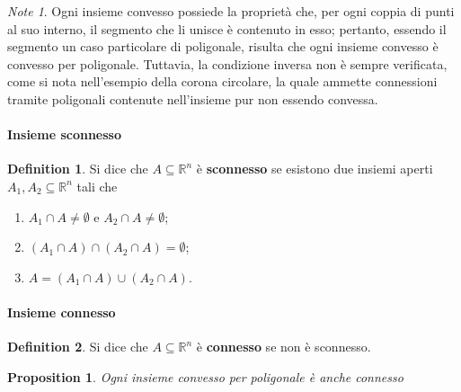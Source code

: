 \documentclass{article}
\theoremstyle{plain}
\newtheorem{prop}[thm]{Proposition}
\theoremstyle{definition}
\newtheorem{defn}{Definition}[section]
\theoremstyle{remark}
\newtheorem{note}{Note}
\begin{document}
\vspace{10pt}

\begin{note}
    Ogni insieme convesso possiede la proprietà che, per ogni coppia di punti al suo interno, il segmento che li unisce è contenuto in esso; pertanto, 
    essendo il segmento un caso particolare di poligonale, risulta che ogni insieme convesso è convesso per poligonale. 
    Tuttavia, la condizione inversa non è sempre verificata, come si nota nell'esempio della corona circolare, la quale ammette connessioni tramite 
    poligonali contenute nell'insieme pur non essendo convessa.
\end{note}

\vspace{10pt}

\paragraph{Insieme sconnesso}
\begin{bxthm}
\begin{defn}
    Si dice che $A\subseteq\mathbb{R}^n$ è \textbf{sconnesso} se esistono due insiemi aperti $A_1,A_2\subseteq\mathbb{R}^n$ tali che 
    \begin{enumerate}
        \item $A_1\cap A\neq\emptyset$ e $A_2\cap A\neq\emptyset$;
        \item $(A_1\cap A)\cap(A_2\cap A)=\emptyset$;
        \item $A=(A_1\cap A)\cup(A_2\cap A)$.
    \end{enumerate}
\end{defn}
\end{bxthm}

\vspace{10pt}

\paragraph{Insieme connesso}
\begin{bxthm}
\begin{defn}
    Si dice che $A\subseteq\mathbb{R}^n$ è \textbf{connesso} se non è sconnesso.
\end{defn}
\end{bxthm}

\vspace{10pt}

\begin{bxthm}
\begin{prop}
    Ogni insieme convesso per poligonale è anche connesso
\end{prop}
\end{bxthm}
\end{document}
